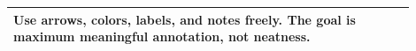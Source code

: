 \documentclass{article}
\begin{document}
\begin{flushleft}
\begin{tabular}{|p{0.9\linewidth}|}
Use arrows, colors, labels, and notes freely. The goal is \textbf{maximum meaningful annotation}, not neatness. \\
\hline
\end{tabular}
\newpage
















\end{flushleft}
\end{document}
